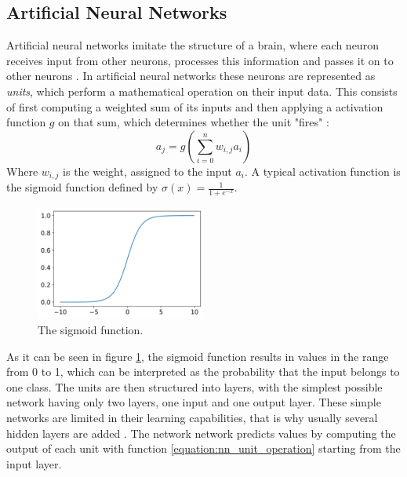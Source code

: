 \subsection{Artificial Neural Networks}
Artificial neural networks imitate the structure of a brain, where each neuron receives input from other neurons, processes this information and passes it on to other neurons \cite[p. 727]{Russel2016}.
In artificial neural networks these neurons are represented as \textit{units}, which perform a mathematical operation on their input data.
This consists of first computing a weighted sum of its inputs and then applying a activation function $g$ on that sum, which determines whether the unit "fires" \cite[pp. 727-728]{Russel2016}:
\begin{equation}
    a_j=g\left(\sum_{i=0}^{n}w_{i,j}a_{i}\right)
    \label{equation:nn_unit_operation}
\end{equation}
Where $w_{i,j}$ is the weight, assigned to the input $a_i$.
A typical activation function is the sigmoid function defined by $\sigma(x)=\frac{1}{1+e^{-x}}$.
\begin{figure}[h]
    \centering
    \includegraphics[width=0.5\textwidth]{figures/sigmoid.png}
    \caption{The sigmoid function.}
    \label{figure:sigmoid}
\end{figure}
As it can be seen in figure \ref{figure:sigmoid}, the sigmoid function results in values in the range from 0 to 1, which can be interpreted as the probability that the input belongs to one class.
The units are then structured into layers, with the simplest possible network having only two layers, one input and one output layer.
These simple networks are limited in their learning capabilities, that is why usually several hidden layers are added \cite[pp. 730-731]{Russel2016}.
The network network predicts values by computing the output of each unit with function \ref{equation:nn_unit_operation} starting from the input layer.
